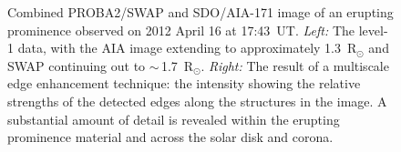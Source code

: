 \documentclass[preprint2]{aastex}
\begin{document}
\begin{figure}[t]
\caption{Combined PROBA2/SWAP and SDO/AIA-171 image of an erupting prominence observed on 2012 April 16 at 17:43~UT. \emph{Left:} The level-1 data, with the AIA image extending to approximately 1.3~R$_\odot$ and SWAP continuing out to $\sim$\,1.7~R$_\odot$. \emph{Right:} The result of a multiscale edge enhancement technique: the intensity showing the relative strengths of the detected edges along the structures in the image. A substantial amount of detail is revealed within the erupting prominence material and across the solar disk and corona.}
\label{smaps}
\end{figure}
\end{document}

